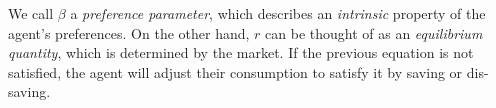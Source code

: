 \documentclass[11pt]{article}
\begin{document}
We call \(\beta\) a \textit{preference parameter}, which describes an \textit{intrinsic} property of the agent's preferences.
On the other hand, \(r\) can be thought of as an \textit{equilibrium quantity}, which is determined by the market.
If the previous equation is not satisfied, the agent will adjust their consumption to satisfy it by saving or dis-saving.
\end{document}
